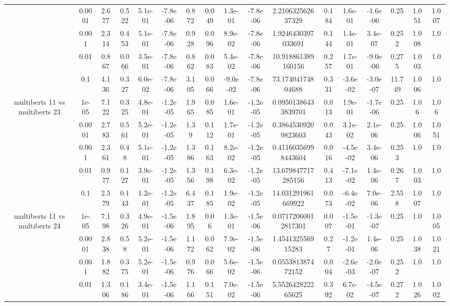 \begin{tabular}{|c|c|c|c|c|c|c|c|c|c|c|c|c|c|c|c|c|}
 & 0.0001 & 2.677 & 0.522 & 5.1e-01 & -7.8e-06 & 0.872 & 0.049 & 1.3e-01 & -7.8e-06 & 2.210632562637329 & 0.184 & 1.6e-01 & -1.6e-06 & 0.25 & 1.051 & 1.007 \\
 & 0.001 & 2.314 & 0.453 & 5.1e-01 & -7.8e-06 & 0.928 & 0.096 & 8.9e-02 & -7.8e-06 & 1.9246430397033691 & 0.144 & 1.4e-01 & 3.4e-07 & 0.252 & 1.008 & 1.0 \\
 & 0.01 & 0.867 & 0.066 & 3.5e-01 & -7.8e-06 & 0.862 & 0.083 & 5.4e-02 & -7.8e-06 & 10.918861389160156 & 0.257 & 1.7e-01 & -9.0e-06 & 0.275 & 1.003 & 1.0 \\
 & 0.1 & 4.136 & 0.327 & 6.0e-02 & -7.8e-06 & 3.105 & 0.066 & -9.0e-02 & -7.8e-06 & 73.17404174804688 & 0.331 & -3.6e-02 & -3.0e-07 & 11.749 & 1.006 & 1.0 \\
\hline
\multirow{5}{*}{multiberts 11 vs multiberts 23} & 1e-05 & 7.122 & 0.325 & 4.8e-01 & -1.2e-05 & 1.965 & 0.085 & 1.6e-01 & -1.2e-05 & 0.09501386433839701 & 0.013 & 1.9e-01 & -1.7e-06 & 0.25 & 1.06 & 1.06 \\
 & 0.0001 & 2.783 & 0.561 & 5.2e-01 & -1.2e-05 & 1.39 & 0.112 & 1.7e-01 & -1.2e-05 & 0.38645309209823603 & 0.043 & 3.1e-02 & 2.1e-06 & 0.25 & 1.006 & 1.051 \\
 & 0.001 & 2.361 & 0.48 & 5.1e-01 & -1.2e-05 & 1.386 & 0.163 & 8.2e-02 & -1.2e-05 & 0.41160356998443604 & 0.016 & -4.5e-02 & 3.4e-06 & 0.253 & 1.0 & 1.0 \\
 & 0.01 & 0.977 & 0.127 & 3.9e-01 & -1.2e-05 & 1.356 & 0.198 & 6.3e-02 & -1.2e-05 & 13.679847717285156 & 0.413 & -7.1e-02 & 1.4e-06 & 0.267 & 1.003 & 1.0 \\
 & 0.1 & 2.579 & 0.143 & 1.2e-01 & -1.2e-05 & 6.437 & 0.185 & 1.9e-02 & -1.2e-05 & 14.031291961669922 & 0.073 & -6.4e-02 & 7.0e-06 & 2.558 & 1.007 & 1.0 \\
\hline
\multirow{5}{*}{multiberts 11 vs multiberts 24} & 1e-05 & 7.198 & 0.326 & 4.9e-01 & -1.5e-06 & 1.895 & 0.06 & 1.3e-01 & -1.5e-06 & 0.07172060012817301 & 0.007 & -1.5e-01 & -1.3e-07 & 0.25 & 1.0 & 1.005 \\
 & 0.0001 & 2.838 & 0.58 & 5.2e-01 & -1.5e-06 & 1.172 & 0.062 & 7.9e-02 & -1.5e-06 & 1.454132556915283 & 0.27 & -1.2e-01 & 1.4e-06 & 0.25 & 1.038 & 1.021 \\
 & 0.001 & 1.882 & 0.375 & 5.2e-01 & -1.5e-06 & 0.976 & 0.066 & 5.6e-02 & -1.5e-06 & 0.055381387472152 & 0.004 & -2.6e-03 & -2.0e-07 & 0.252 & 1.0 & 1.0 \\
 & 0.01 & 1.306 & 0.186 & 3.4e-01 & -1.5e-06 & 1.166 & 0.151 & 7.0e-02 & -1.5e-06 & 5.552642822265625 & 0.392 & 6.7e-02 & -4.5e-07 & 0.272 & 1.026 & 1.002 \\

\end{tabular}
